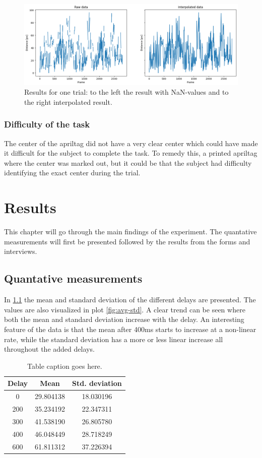 \documentclass[nofilelist]{cslthse-msc}
\begin{document}
\begin{figure}[!hbt]
   \centering
   \includegraphics[scale=0.5]{images/raw-vs-interpolated.png} 
   \caption{Results for one trial: to the left the result with NaN-values and to the right interpolated result.}
   \label{fig:raw-vs-interpolated}
\end{figure}

\subsection{Difficulty of the task}
The center of the apriltag did not have a very clear center which could have made it difficult for the subject to complete the task. To remedy this, a printed apriltag where the center was marked out, but it could be that the subject had difficulty identifying the exact center during the trial. 

\chapter{Results}
This chapter will go through the main findings of the experiment. The quantative measurements will first be presented followed by the results from the forms and interviews.

\section{Quantative measurements}
In \ref{tab:averages} the mean and standard deviation of the different delays are presented. The values are also visualized in plot \ref{fig:avg-std}. A clear trend can be seen where both the mean and standard deviation increase with the delay. An interesting feature of the data is that the mean after 400ms starts to increase at a non-linear rate, while the standard deviation has a more or less linear increase all throughout the added delays.

\begin{table}[ht]
   \centering
   \begin{tabular}{|c|c|c|}
   \hline
   \textbf{Delay} & \textbf{ Mean} & \textbf{Std. deviation} \\
   \hline
   0 & 29.804138 & 18.030196 \\ \hline
   200 & 35.234192 & 22.347311 \\ \hline
   300 & 41.538190 & 26.805780 \\ \hline
   400 & 46.048449 & 28.718249 \\ \hline
   600 & 61.811312 & 37.226394 \\ \hline
   \end{tabular}
   \caption{Table caption goes here.}
   \label{tab:averages}
\end{table}
\end{document}
